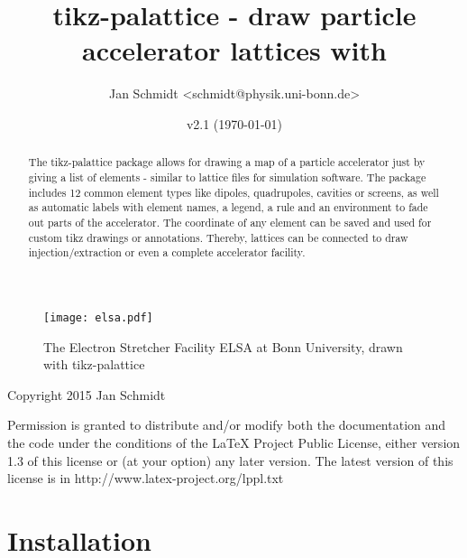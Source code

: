 \documentclass[a4paper]{scrartcl}
\author{Jan Schmidt <schmidt@physik.uni-bonn.de>}
\date{v2.1 (\today)}
\title{tikz-palattice - draw particle accelerator lattices with \tikzlabel}
\begin{document}

\maketitle

\begin{abstract}
  The tikz-palattice package allows for drawing a map of a particle accelerator just by
  giving a list of elements - similar to lattice files for simulation software. The
  package includes 12 common element types like dipoles, quadrupoles, cavities or screens,
  as well as automatic labels with element names, a legend, a rule and an environment to
  fade out parts of the accelerator. The coordinate of any element can be saved and used
  for custom tikz drawings or annotations. Thereby, lattices can be connected to draw
  injection/extraction or even a complete accelerator facility.
\end{abstract}


\begin{figure}[h]
  \centering
  \texttt{[image: elsa.pdf]}
  \caption{The Electron Stretcher Facility ELSA at Bonn University, drawn with
    tikz-palattice}
\label{fig:elsa}
\end{figure}


\clearpage
\parindent=0pt
Copyright 2015 Jan Schmidt

\medskip
Permission is granted to distribute and/or modify both the documentation and the code
under the conditions of the LaTeX Project Public License, either version 1.3 of this
license or (at your option) any later version. The latest version of this license is in
http://www.latex-project.org/lppl.txt

\tableofcontents

\section{Installation}
\label{sec-1}
\end{document}
